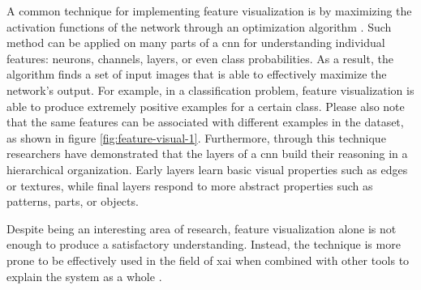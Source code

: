 A common technique for implementing feature visualization is by maximizing the activation functions of the network through an optimization algorithm \cite{erhan2009feature} \cite{nguyen2016multifaceted}. Such method can be applied on many parts of a \gls{cnn} for understanding individual features: neurons, channels, layers, or even class probabilities. As a result, the algorithm finds a set of input images that is able to effectively maximize the network's output. For example, in a classification problem, feature visualization is able to produce extremely positive examples for a certain class. Please also note that the same features can be associated with different examples in the dataset, as shown in figure \ref{fig:feature-visual-1}. Furthermore, through this technique researchers have demonstrated \cite{olah2017feature} that the layers of a \gls{cnn} build their reasoning in a hierarchical organization. Early layers learn basic visual properties such as edges or textures, while final layers respond to more abstract properties such as patterns, parts, or objects.

Despite being an interesting area of research, feature visualization alone is not enough to produce a satisfactory understanding. Instead, the technique is more prone to be effectively used in the field of \gls{xai} when combined with other tools to explain the system as a whole \cite{zurowietz2020intvis} \cite{olah2018the}.

